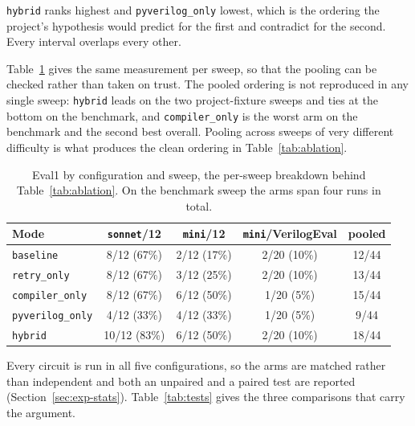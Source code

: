 \documentclass[11pt,a4paper,titlepage=false]{scrreprt}
\begin{document}
\texttt{hybrid} ranks highest and \texttt{pyverilog\_only} lowest, which is the ordering the
project's hypothesis would predict for the first and contradict for the second. Every
interval overlaps every other.

Table~\ref{tab:ablation-bysweep} gives the same measurement per sweep, so that the pooling
can be checked rather than taken on trust. The pooled ordering is not reproduced in any
single sweep: \texttt{hybrid} leads on the two project-fixture sweeps and ties at the bottom
on the benchmark, and \texttt{compiler\_only} is the worst arm on the benchmark and the
second best overall. Pooling across sweeps of very different difficulty is what produces the
clean ordering in Table~\ref{tab:ablation}.

\begin{table}[H]
\centering
\small
\begin{tabular}{@{}l c c c c@{}}
\toprule
\textbf{Mode} & \texttt{sonnet}/12 & \texttt{mini}/12 & \texttt{mini}/VerilogEval & \textbf{pooled} \\
\midrule
\texttt{baseline}        & 8/12 (67\%)  & 2/12 (17\%) & 2/20 (10\%) & 12/44 \\
\texttt{retry\_only}     & 8/12 (67\%)  & 3/12 (25\%) & 2/20 (10\%) & 13/44 \\
\texttt{compiler\_only}  & 8/12 (67\%)  & 6/12 (50\%) & 1/20 (5\%)  & 15/44 \\
\texttt{pyverilog\_only} & 4/12 (33\%)  & 4/12 (33\%) & 1/20 (5\%)  & 9/44  \\
\texttt{hybrid}          & 10/12 (83\%) & 6/12 (50\%) & 2/20 (10\%) & 18/44 \\
\bottomrule
\end{tabular}
\caption{Eval1 by configuration and sweep, the per-sweep breakdown behind
Table~\ref{tab:ablation}. On the benchmark sweep the arms span four runs in total.}
\label{tab:ablation-bysweep}
\end{table}

Every circuit is run in all five configurations, so the arms are matched rather than
independent and both an unpaired and a paired test are reported
(Section~\ref{sec:exp-stats}). Table~\ref{tab:tests} gives the three comparisons that
carry the argument.
\end{document}
